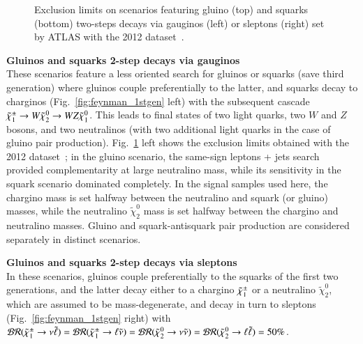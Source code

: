\begin{figure}[t]
\centering
{}
\caption{Exclusion limits on scenarios featuring gluino (top) and squarks (bottom) two-steps decays via gauginos (left) or sleptons (right) 
set by ATLAS with the 2012 dataset~\cite{DraftSquarkGluinoSummaryPaper}.}
\label{fig:run1excluded_1stgen}
\end{figure}

\par{\bf Gluinos and squarks 2-step decays via gauginos\\}
These scenarios feature a less oriented search for gluinos or squarks (save third generation) where gluinos couple preferentially to the latter, 
and squarks decay to charginos (Fig.~\ref{fig:feynman_1stgen} left) with the subsequent cascade $\tilde{\chi}_{1}^{\pm}\rightarrow W\tilde{\chi}_{2}^{0} \rightarrow WZ\tilde{\chi}_{1}^{0}$. 
This leads to final states of two light quarks, two $W$ and $Z$ bosons, and two neutralinos 
(with two additional light quarks in the case of gluino pair production). 
Fig.~\ref{fig:run1excluded_1stgen} left shows the exclusion limits obtained with the 2012 dataset~\cite{DraftSquarkGluinoSummaryPaper}; 
in the gluino scenario, the same-sign leptons + jets search provided complementarity at large neutralino mass, 
while its sensitivity in the squark scenario dominated completely. 
In the signal samples used here, the chargino mass is set halfway between the neutralino and squark (or gluino) masses, 
while the neutralino $\tilde{\chi}_{2}^{0}$ mass is set halfway between the chargino and neutralino masses. 
Gluino and squark-antisquark pair production are considered separately in distinct scenarios.  
\\
\par{\bf Gluinos and squarks 2-step decays via sleptons\\}
In these scenarios, gluinos couple preferentially to the squarks of the first two generations, and
the latter decay either to a chargino $\tilde{\chi}_{1}^{\pm}$ or a neutralino $\tilde{\chi}_{2}^{0}$, 
which are assumed to be mass-degenerate, and decay in turn to sleptons (Fig.~\ref{fig:feynman_1stgen} right) 
with $\mathcal{BR}(\tilde{\chi}_{1}^{\pm}\rightarrow\nu\tilde\ell) = \mathcal{BR}(\tilde{\chi}_{1}^{\pm}\rightarrow\ell\tilde\nu) 
= \mathcal{BR}(\tilde{\chi}_{2}^{0}\rightarrow\nu\tilde\nu) = \mathcal{BR}(\tilde{\chi}_{2}^{0}\rightarrow\ell\tilde\ell)=50\%$. 
